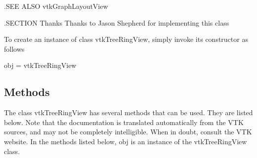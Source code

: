 .S\-E\-E A\-L\-S\-O vtk\-Graph\-Layout\-View

.S\-E\-C\-T\-I\-O\-N Thanks Thanks to Jason Shepherd for implementing this class

To create an instance of class vtk\-Tree\-Ring\-View, simply invoke its constructor as follows \begin{DoxyVerb}  obj = vtkTreeRingView
\end{DoxyVerb}
 \hypertarget{vtkwidgets_vtkxyplotwidget_Methods}{}\subsection{Methods}\label{vtkwidgets_vtkxyplotwidget_Methods}
The class vtk\-Tree\-Ring\-View has several methods that can be used. They are listed below. Note that the documentation is translated automatically from the V\-T\-K sources, and may not be completely intelligible. When in doubt, consult the V\-T\-K website. In the methods listed below, {\ttfamily obj} is an instance of the vtk\-Tree\-Ring\-View class. 

